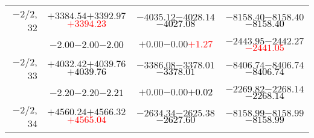 \documentclass[compress]{beamer}
\begin{document}
\begin{frame}
{\begin{tabular}{r | c | c | c}
$-$2/2, 32 & $+3384.54$\hspace{0.1 cm}$+3392.97$\hspace{0.1 cm}\textcolor{red}{$+3394.23$} & $-4035.12$\hspace{0.1 cm}$-4028.14$\hspace{0.1 cm}\textcolor{black}{$-4027.08$} & $-8158.40$\hspace{0.1 cm}$-8158.40$\hspace{0.1 cm}\textcolor{black}{$-8158.40$} \\
           & $-2.00$\hspace{0.1 cm}$-2.00$\hspace{0.1 cm}\textcolor{black}{$-2.00$} & $+0.00$\hspace{0.1 cm}$-0.00$\hspace{0.1 cm}\textcolor{red}{$+1.27$} & $-2443.95$\hspace{0.1 cm}$-2442.27$\hspace{0.1 cm}\textcolor{red}{$-2441.05$} \\
$-$2/2, 33 & $+4032.42$\hspace{0.1 cm}$+4039.76$\hspace{0.1 cm}\textcolor{black}{$+4039.76$} & $-3386.08$\hspace{0.1 cm}$-3378.01$\hspace{0.1 cm}\textcolor{black}{$-3378.01$} & $-8406.74$\hspace{0.1 cm}$-8406.74$\hspace{0.1 cm}\textcolor{black}{$-8406.74$} \\
           & $-2.20$\hspace{0.1 cm}$-2.20$\hspace{0.1 cm}\textcolor{black}{$-2.21$} & $+0.00$\hspace{0.1 cm}$-0.00$\hspace{0.1 cm}\textcolor{black}{$+0.02$} & $-2269.82$\hspace{0.1 cm}$-2268.14$\hspace{0.1 cm}\textcolor{black}{$-2268.14$} \\
$-$2/2, 34 & $+4560.24$\hspace{0.1 cm}$+4566.32$\hspace{0.1 cm}\textcolor{red}{$+4565.04$} & $-2634.34$\hspace{0.1 cm}$-2625.38$\hspace{0.1 cm}\textcolor{black}{$-2627.60$} & $-8158.99$\hspace{0.1 cm}$-8158.99$\hspace{0.1 cm}\textcolor{black}{$-8158.99$} \\

\end{tabular}}
\end{frame}
\end{document}
